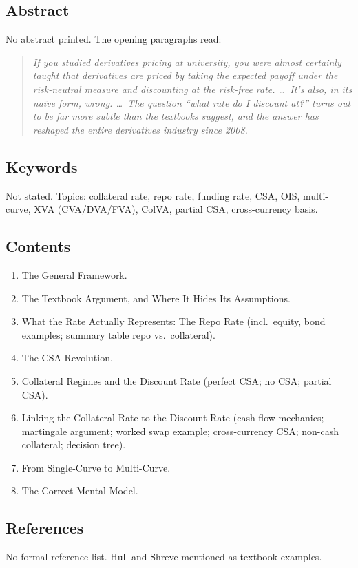 \documentclass[11pt,a4paper]{article}
\begin{document}
\subsection*{Abstract}
No abstract printed. The opening paragraphs read:
\begin{quote}\itshape
If you studied derivatives pricing at university, you were almost
certainly taught that derivatives are priced by taking the expected
payoff under the risk-neutral measure and discounting at the
risk-free rate. \dots\ It's also, in its na\"ive form, wrong. \dots\
The question ``what rate do I discount at?'' turns out to be far
more subtle than the textbooks suggest, and the answer has reshaped
the entire derivatives industry since 2008.
\end{quote}

\subsection*{Keywords}
Not stated. Topics: collateral rate, repo rate, funding rate, CSA,
OIS, multi-curve, XVA (CVA/DVA/FVA), ColVA, partial CSA,
cross-currency basis.

\subsection*{Contents}
\begin{enumerate}[noitemsep]
  \item The General Framework.
  \item The Textbook Argument, and Where It Hides Its Assumptions.
  \item What the Rate Actually Represents: The Repo Rate (incl.\ equity, bond examples; summary table repo vs.\ collateral).
  \item The CSA Revolution.
  \item Collateral Regimes and the Discount Rate (perfect CSA; no CSA; partial CSA).
  \item Linking the Collateral Rate to the Discount Rate (cash flow mechanics; martingale argument; worked swap example; cross-currency CSA; non-cash collateral; decision tree).
  \item From Single-Curve to Multi-Curve.
  \item The Correct Mental Model.
\end{enumerate}

\subsection*{References}
No formal reference list. Hull and Shreve mentioned as textbook examples.
\end{document}
